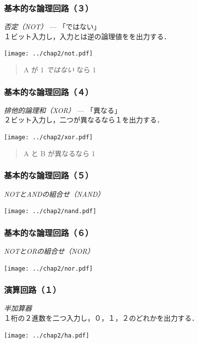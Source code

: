 \documentclass{beamer}                 %
\begin{document}
\begin{frame}
  \frametitle{基本的な論理回路（３）}
  \emph{否定（NOT）} --- 「ではない」\\
  \vfill
  １ビット入力し，入力とは逆の論理値をを出力する．
  \begin{center}
    \texttt{[image: ../chap2/not.pdf]}
  \end{center}
  \begin{quote}
    A が 1 \emph{ではない} なら 1\\
  \end{quote}
\end{frame}

\begin{frame}
  \frametitle{基本的な論理回路（４）}
  \emph{排他的論理和（XOR）} --- 「異なる」\\
  \vfill
  ２ビット入力し，二つが異なるなら１を出力する．
  \begin{center}
    \texttt{[image: ../chap2/xor.pdf]}
  \end{center}
  \begin{quote}
    A と B が異なるなら 1\\
  \end{quote}
\end{frame}

\begin{frame}
  \frametitle{基本的な論理回路（５）}
  \emph{NOTとANDの組合せ（NAND）} \\
  \vfill
  \begin{center}
    \texttt{[image: ../chap2/nand.pdf]}
  \end{center}
\end{frame}

\begin{frame}
  \frametitle{基本的な論理回路（６）}
  \emph{NOTとORの組合せ（NOR）} \\
  \vfill
  \begin{center}
    \texttt{[image: ../chap2/nor.pdf]}
  \end{center}
\end{frame}

\begin{frame}
  \frametitle{演算回路（１）}
  \emph{半加算器} \\
  １桁の２進数を二つ入力し，０，１，２のどれかを出力する．
  \vfill
  \begin{center}
    \texttt{[image: ../chap2/ha.pdf]}
  \end{center}
\end{frame}
\end{document}
